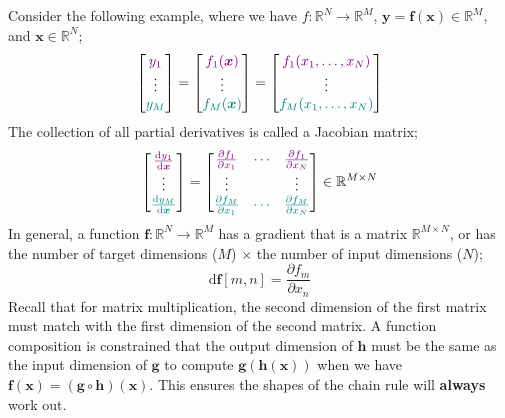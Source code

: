 \documentclass[a4paper, 12pt]{article}
\newcommand{\pdif}[2]{\frac{\partial #1}{\partial #2}}
\newcommand{\dif}[2]{\frac{\mathrm{d}#1}{\mathrm{d}#2}}
\renewcommand{\vec}[1]{\boldsymbol{#1}}
\newcommand{\violet}[1]{\textcolor{violet}{#1}}
\newcommand{\teal}[1]{\textcolor{teal}{#1}}
\begin{document}
            Consider the following example, where we have $f : \mathbb{R}^N \to \mathbb{R}^M$, $\vec{y} = \vec{f}(\vec{x}) \in \mathbb{R}^M$, and $\vec{x} \in \mathbb{R}^N$;
            $$\begin{bmatrix}
                \violet{y_1} \\ \vdots \\ \teal{y_M}
            \end{bmatrix} = \begin{bmatrix}
                \violet{f_1(\vec{x})} \\ \vdots \\ \teal{f_M(\vec{x})}
            \end{bmatrix} = \begin{bmatrix}
                \violet{f_1(x_1, \dots, x_N)} \\ \vdots \\ \teal{f_M(x_1, \dots, x_N)}
            \end{bmatrix}$$
            The collection of all partial derivatives is called a Jacobian matrix;
            $$\begin{bmatrix}
                \violet{\dif{y_1}{\vec{x}}} \\ \vdots \\ \teal{\dif{y_M}{\vec{x}}}
            \end{bmatrix} = \begin{bmatrix}
                \violet{\pdif{f_1}{x_1}} & \violet{\cdots} & \violet{\pdif{f_1}{x_N}} \\
                \vdots & & \vdots \\
                \teal{\pdif{f_M}{x_1}} & \teal{\cdots} & \teal{\pdif{f_M}{x_N}}
            \end{bmatrix} \in \mathbb{R}^{M \times N}$$
            In general, a function $\vec{f} : \mathbb{R}^N \to \mathbb{R}^M$ has a gradient that is a matrix $\mathbb{R}^{M \times N}$, or has the number of target dimensions ($M$) $\times$ the number of input dimensions ($N$);
            $$\mathrm{d}\vec{f}[m, n] = \pdif{f_m}{x_n}$$
            Recall that for matrix multiplication, the second dimension of the first matrix must match with the first dimension of the second matrix.
            A function composition is constrained that the output dimension of $\vec{h}$ must be the same as the input dimension of $\vec{g}$ to compute $\vec{g}(\vec{h}(\vec{x}))$ when we have $\vec{f}(\vec{x}) = (\vec{g} \circ \vec{h})(\vec{x})$.
            This ensures the shapes of the chain rule will \textbf{always} work out.
\end{document}

